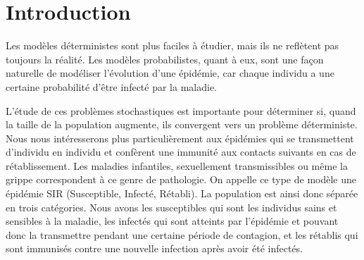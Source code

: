 \chapter{Introduction}

Les modèles déterministes sont plus faciles à étudier, mais ils ne reflètent pas toujours la réalité. Les modèles probabilistes, quant à eux, sont une façon naturelle de modéliser l’évolution d’une épidémie, car chaque individu a une certaine probabilité d’être infecté par la maladie.

L’étude de ces problèmes stochastiques est importante pour déterminer si, quand la taille de la population augmente, ils convergent vers un problème déterministe. Nous nous intéresserons plus particulièrement aux épidémies qui se transmettent d’individu en individu et confèrent une immunité aux contacts suivants en cas de rétablissement. Les maladies infantiles, sexuellement transmissibles ou même la grippe correspondent à ce genre de pathologie. On appelle ce type de modèle une épidémie SIR (Susceptible, Infecté, Rétabli). La population est ainsi donc séparée en trois catégories. Nous avons les susceptibles qui sont les individus sains et sensibles à la maladie, les infectés qui sont atteints par l’épidémie et pouvant donc la transmettre pendant une certaine période de contagion, et les rétablis qui sont immunisés contre une nouvelle infection après avoir été infectés.
